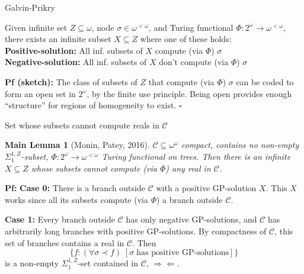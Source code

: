 \begin{frame}{Galvin-Prikry}
  \begin{fact*}
    Given infinite set $Z\subseteq\omega$, node $\sigma\in\omega^{<\omega}$,
    and Turing functional $\Phi:2^\omega\rightarrow \omega^{<\omega}$,
    there exists an infinite subset $X\subseteq Z$ where one of these
    holds:\\

    \vspace{1em}
    \textbf{Positive-solution:} All inf. subsets of $X$ compute (via
    $\Phi$) $\sigma$ \\
    \textbf{Negative-solution:} All inf. subsets of $X$ don't compute (via
    $\Phi$) $\sigma$
  \end{fact*}

  \vspace{1em}
  \textbf{Pf (sketch):} The class of subsets of $Z$ that compute (via
  $\Phi$) $\sigma$ can be coded to form an open set in $2^\omega$, by the
  finite use principle. Being open provides enough ``structure'' for
  regions of homogeneity to exist. $\square$
\end{frame}

\begin{frame}{Set whose subsets cannot compute reals in $\mathcal{C}$}
  \newtheorem*{main-lemma*}{Main Lemma}
  \begin{main-lemma*}[Monin, Patey, 2016]
    $\mathcal{C}\subseteq\omega^\omega$ compact, contains no non-empty
    $\Sigma_1^{1,Z}$-subset, $\Phi:2^{\omega}\rightarrow \omega^{<\omega}$
    Turing functional on trees. Then there is an infinite $X\subseteq Z$
    whose subsets cannot compute (via $\Phi$) any real in $\mathcal{C}$.
  \end{main-lemma*}

  \vspace{0.5em}
  \textbf{Pf:} \textbf{Case 0:} There is a branch outside
  $\mathcal{C}$ with a positive GP-solution $X$. This $X$ works since
  all its subsets compute (via $\Phi$) a branch outside $\mathcal{C}$.

  \vspace{0.5em}
  \textbf{Case 1:} Every branch outside $\mathcal{C}$ has only negative
  GP-solutions, and $\mathcal{C}$ has arbitrarily long branches with
  positive GP-solutions. By compactness of $\mathcal{C}$, this set of
  branches contains a real in $\mathcal{C}$. Then
  \[\{f:(\forall \sigma\prec f)\; [\sigma\; \text{has
  positive GP-solutions}]\}\] is a non-empty $\Sigma_1^{1,Z}$-set contained
  in $\mathcal{C}$, $\Rightarrow\Leftarrow$.
\end{frame}

